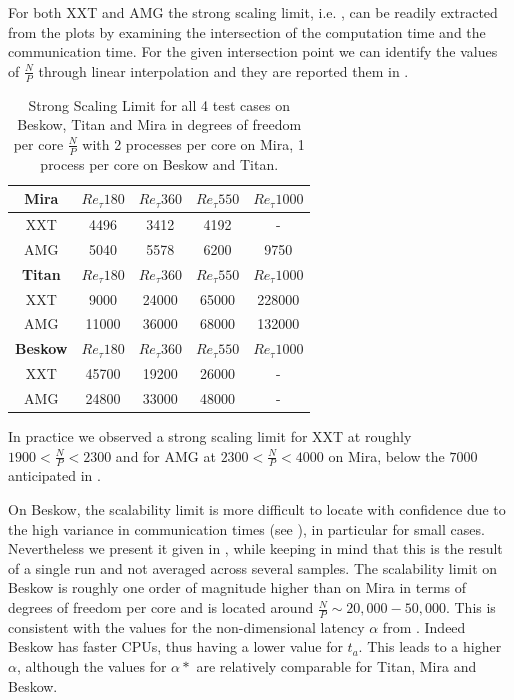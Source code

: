 \documentclass{sig-alternate}
\begin{document}
For both XXT and AMG the strong scaling limit, i.e. , can be readily extracted from the plots by examining the intersection of the computation time 
and the communication time. For the given intersection point we can identify the values of $\frac{N}{P}$ through linear interpolation and they are reported them in .

\begin{table}  
  \caption{Strong Scaling Limit for all 4 test cases on Beskow, Titan and Mira
  in degrees of freedom per core $\frac{N}{P}$ with 2 processes per core on Mira, 1 process per core on Beskow and Titan.}%
  \centering
  \begin{tabular}{c||cccc}
    \hline
    \hline
    {\bf Mira}
    &$Re_{\tau} 180$&$Re_{\tau} 360$&$Re_{\tau} 550$&$Re_{\tau} 1000$\\
    \hline
    XXT&4496&3412&4192&-\\
    AMG&5040&5578&6200&9750\\
    \hline
    \hline
    {\bf Titan}
    &$Re_{\tau} 180$&$Re_{\tau} 360$&$Re_{\tau} 550$&$Re_{\tau} 1000$\\
    \hline
    XXT&9000&24000&65000&228000\\
    AMG&11000&36000&68000&132000\\
    \hline
    \hline
    {\bf Beskow}
    &$Re_{\tau} 180$&$Re_{\tau} 360$&$Re_{\tau} 550$&$Re_{\tau} 1000$\\
    \hline
    XXT&45700&19200&26000& - \\
    AMG&24800&33000&48000& - \\
    \hline
    \hline
  \end{tabular}
  \label{tab:stronglimit}
\end{table}

% 

In practice we observed a strong scaling limit for XXT at roughly $1900<
\frac{N}{P} < 2300$ and for AMG at $2300<\frac{N}{P}<4000$ on Mira, below the $7000$
anticipated in \cite{fischer:scaling}. 

On Beskow, the scalability limit is more difficult to locate with confidence due 
to the high variance in communication times (see ), 
in particular for small cases. Nevertheless we present it given in 
, while keeping in mind that this is the result of a 
single run and not averaged across several samples. The scalability limit on 
Beskow is roughly one order of magnitude higher than on Mira in terms of degrees
of freedom per core and is located around $\frac{N}{P} \sim 20,000 - 50,000$. This 
is consistent with the values for the non-dimensional latency $\alpha$ 
from . Indeed Beskow has faster CPUs, thus having a
lower value for $t_a$. This leads to a higher $\alpha$, although the values for
$\alpha*$ are relatively comparable for Titan, Mira and Beskow. %
\end{document}
